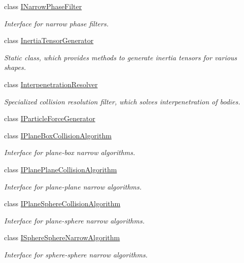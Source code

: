 \begin{DoxyCompactItemize}
class \mbox{\hyperlink{classr3_1_1_i_narrow_phase_filter}{I\+Narrow\+Phase\+Filter}}
\begin{DoxyCompactList}\small\item\em Interface for narrow phase filters. \end{DoxyCompactList}\item 
class \mbox{\hyperlink{classr3_1_1_inertia_tensor_generator}{Inertia\+Tensor\+Generator}}
\begin{DoxyCompactList}\small\item\em Static class, which provides methods to generate inertia tensors for various shapes. \end{DoxyCompactList}\item 
class \mbox{\hyperlink{classr3_1_1_interpenetration_resolver}{Interpenetration\+Resolver}}
\begin{DoxyCompactList}\small\item\em Specialized collision resolution filter, which solves interpenetration of bodies. \end{DoxyCompactList}\item 
class \mbox{\hyperlink{classr3_1_1_i_particle_force_generator}{I\+Particle\+Force\+Generator}}
\item 
class \mbox{\hyperlink{classr3_1_1_i_plane_box_collision_algorithm}{I\+Plane\+Box\+Collision\+Algorithm}}
\begin{DoxyCompactList}\small\item\em Interface for plane-\/box narrow algorithms. \end{DoxyCompactList}\item 
class \mbox{\hyperlink{classr3_1_1_i_plane_plane_collision_algorithm}{I\+Plane\+Plane\+Collision\+Algorithm}}
\begin{DoxyCompactList}\small\item\em Interface for plane-\/plane narrow algorithms. \end{DoxyCompactList}\item 
class \mbox{\hyperlink{classr3_1_1_i_plane_sphere_collision_algorithm}{I\+Plane\+Sphere\+Collision\+Algorithm}}
\begin{DoxyCompactList}\small\item\em Interface for plane-\/sphere narrow algorithms. \end{DoxyCompactList}\item 
class \mbox{\hyperlink{classr3_1_1_i_sphere_sphere_narrow_algorithm}{I\+Sphere\+Sphere\+Narrow\+Algorithm}}
\begin{DoxyCompactList}\small\item\em Interface for sphere-\/sphere narrow algorithms. \end{DoxyCompactList}\item 

\end{DoxyCompactItemize}

